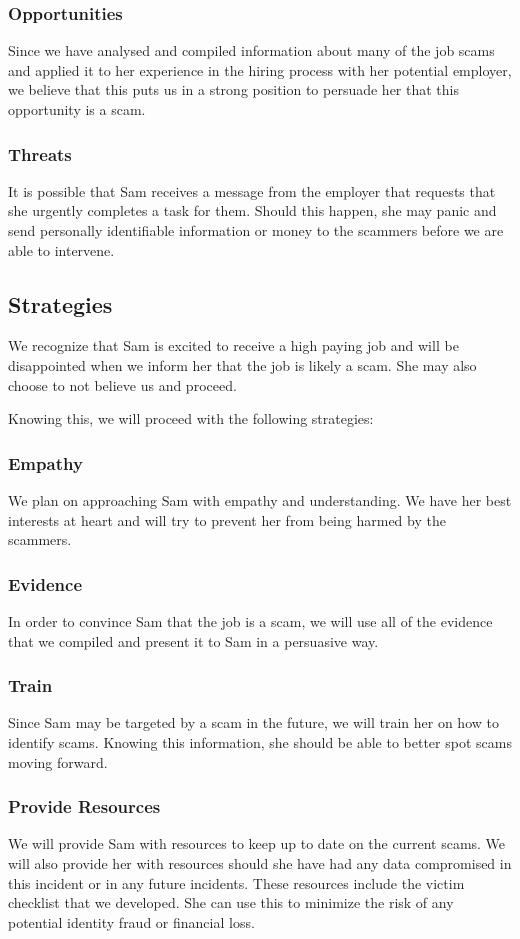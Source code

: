\begin{fullwidth}
\subsubsection{Opportunities}
Since we have analysed and compiled information about many of the job scams and applied it to her experience in the hiring process with her potential employer, we believe that this puts us in a strong position to persuade her that this opportunity is a scam.

\subsubsection{Threats}
It is possible that Sam receives a message from the employer that requests that she urgently completes a task for them. Should this happen, she may panic and send personally identifiable information or money to the scammers before we are able to intervene.

\subsection{Strategies}
We recognize that Sam is excited to receive a high paying job and will be disappointed when we inform her that the job is likely a scam. She may also choose to not believe us and proceed.

Knowing this, we will proceed with the following strategies:
\subsubsection{Empathy}
We plan on approaching Sam with empathy and understanding. We have her best interests at heart and will try to prevent her from being harmed by the scammers.
\subsubsection{Evidence}
In order to convince Sam that the job is a scam, we will use all of the evidence that we compiled and present it to Sam in a persuasive way.
\subsubsection{Train}
Since Sam may be targeted by a scam in the future, we will train her on how to identify scams. Knowing this information, she should be able to better spot scams moving forward.
\subsubsection{Provide Resources}
We will provide Sam with resources to keep up to date on the current scams. We will also provide her with resources should she have had any data compromised in this incident or in any future incidents. These resources include the victim checklist that we developed. She can use this to minimize the risk of any potential identity fraud or financial loss.


\end{fullwidth}
